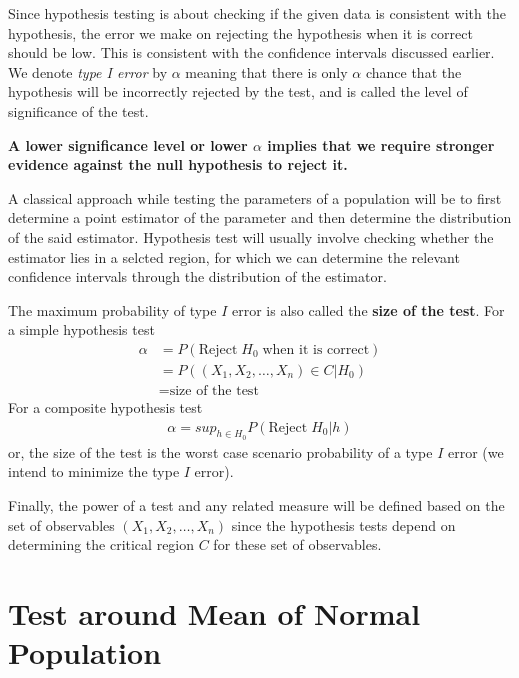\documentclass[../probability-notes.tex]{subfiles}
\begin{document}
    Since hypothesis testing is about checking if the given data is consistent with the hypothesis, the error we make on rejecting the hypothesis when it is correct should be low. This is consistent with the confidence intervals discussed earlier. We denote \emph{type I error} by $\alpha$ meaning that there is only $\alpha$ chance that the hypothesis will be incorrectly rejected by the test, and is called the level of significance of the test.\newline

    \textbf{A lower significance level or lower $\alpha$ implies that we require stronger evidence against the null hypothesis to reject it.}

    A classical approach while testing the parameters of a population will be to first determine a point estimator of the parameter and then determine the distribution of the said estimator. Hypothesis test will usually involve checking whether the estimator lies in a selcted region, for which we can determine the relevant confidence intervals through the distribution of the estimator.\newline

    The maximum probability of type $I$ error is also called the \textbf{size of the test}. For a simple hypothesis test
    \begin{align*}
        \alpha &= P(\text{Reject}\; H_{0}\; \text{when it is correct})\\
        &= P((X_{1}, X_{2}, \ldots, X_{n}) \in C \vert H_{0})\\
        &= \text{size of the test}
    \end{align*}
    For a composite hypothesis test
    \begin{align*}
        \alpha = sup_{h \in H_{0}} P(\text{Reject}\; H_{0} \vert h)
    \end{align*}
    or, the size of the test is the worst case scenario probability of a type $I$ error (we intend to minimize the type $I$ error).

    Finally, the power of a test and any related measure will be defined based on the set of observables $(X_{1}, X_{2}, \ldots, X_{n})$ since the hypothesis tests depend on determining the critical region $C$ for these set of observables.

    \section{Test around Mean of Normal Population}
\end{document}
